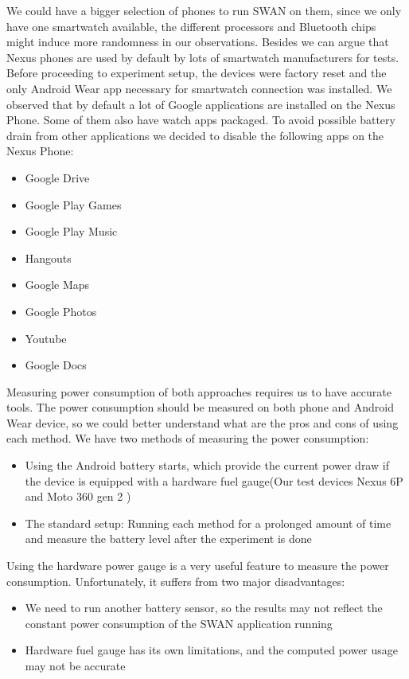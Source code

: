  We could have a bigger selection of phones to run SWAN on them, since we only have one smartwatch available,
 the different processors  and Bluetooth chips might induce more randomness in our observations.
 Besides we can argue that Nexus phones are used by default by lots of smartwatch manufacturers for tests.
 Before proceeding to experiment setup, the devices were factory reset and the only Android Wear app necessary for smartwatch connection was installed.
 We observed that by default a lot of Google applications are installed on the Nexus Phone. Some of them also have watch apps packaged.
 To avoid possible battery drain from other applications we decided to disable the following apps on the Nexus Phone:
 \begin{itemize}
  \item  Google Drive
  \item Google Play Games
  \item Google Play Music
  \item Hangouts
  \item Google Maps
  \item Google Photos
  \item Youtube
  \item Google Docs
 \end{itemize}

 Measuring power consumption of both approaches requires us to have accurate tools.
 The power consumption should be measured on both phone and Android Wear device, so we could better understand what are the pros and cons of using each method.
 We have two methods of measuring the power consumption:
 \begin{itemize}
  \item Using the Android battery starts, which provide the current power draw if the device is equipped with a hardware fuel gauge(Our test devices Nexus 6P and Moto 360 gen 2 )\cite{fuel_gauge}
  \item The standard setup: Running each method for a prolonged amount of time and measure the battery level after the experiment is done
 \end{itemize}

 Using the hardware power gauge is a very useful feature to measure the power consumption. Unfortunately, it suffers from two major disadvantages:
 \begin{itemize}
  \item We need to run another battery sensor, so the results may not reflect the constant power consumption of the SWAN application running
  \item Hardware fuel gauge has its own limitations, and the computed power usage may not be accurate
 \end{itemize}

